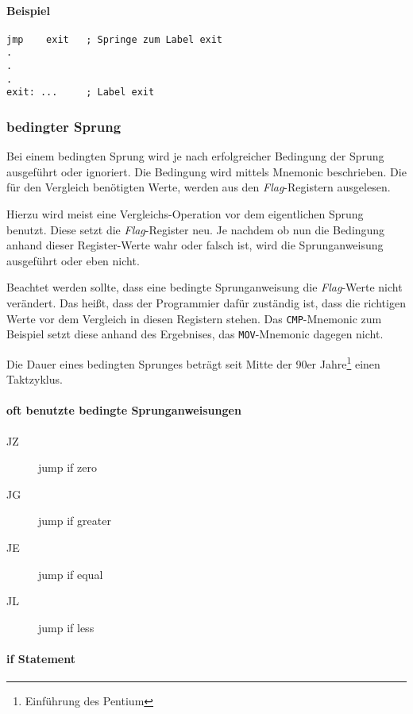 \paragraph{Beispiel\newline}\makebox{}
\begin{lstlisting}
jmp    exit   ; Springe zum Label exit
.
.
.
exit: ...     ; Label exit
\end{lstlisting}

\subsubsection{bedingter Sprung}
Bei einem bedingten Sprung wird je nach erfolgreicher Bedingung der Sprung ausgeführt oder ignoriert. Die Bedingung wird mittels Mnemonic beschrieben. Die für den Vergleich benötigten Werte, werden aus den \textit{Flag}-Registern ausgelesen.

Hierzu wird meist eine Vergleichs-Operation vor dem eigentlichen Sprung benutzt. Diese setzt die \textit{Flag}-Register neu. Je nachdem ob nun die Bedingung anhand dieser Register-Werte wahr oder falsch ist, wird die Sprunganweisung ausgeführt oder eben nicht. 

Beachtet werden sollte, dass eine bedingte Sprunganweisung die \textit{Flag}-Werte nicht verändert. Das heißt, dass der Programmier dafür zuständig ist, dass die richtigen Werte vor dem Vergleich in diesen Registern stehen. Das \texttt{CMP}-Mnemonic zum Beispiel setzt diese anhand des Ergebnises, das \texttt{MOV}-Mnemonic dagegen nicht.

Die Dauer eines bedingten Sprunges beträgt seit Mitte der 90er Jahre\footnote{Einführung des Pentium} einen Taktzyklus.

\paragraph{oft benutzte bedingte Sprunganweisungen}
\begin{description}
	\item [JZ] jump if zero
	\item [JG] jump if greater 
	\item [JE] jump if equal 
	\item [JL] jump if less 
\end{description}

\paragraph{if Statement}

